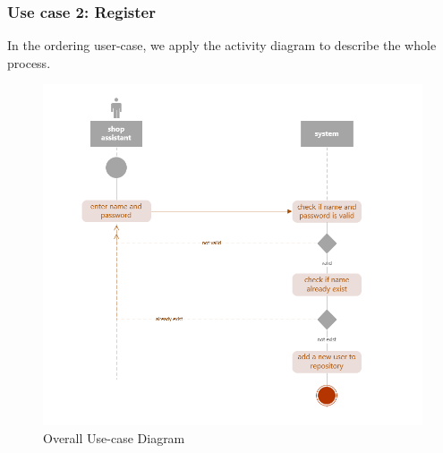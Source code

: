 \documentclass[a4paper]{report}
\begin{document}
\subsubsection{Use case 2: Register}
In the ordering user-case, we apply the activity diagram to describe the whole process. 
\begin{figure}
  \centering
  \includegraphics[scale=0.44]{figure3.jpg}
  \caption{Overall Use-case Diagram}\label{2}
\end{figure}
\end{document}
